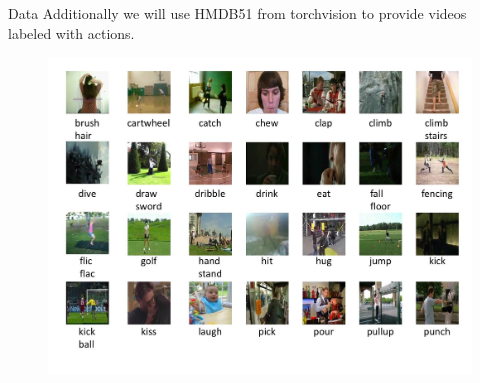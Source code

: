 \documentclass[aspectratio=169]{beamer}
\begin{document}







\begin{frame}{Data}
Additionally we will use HMDB51 from torchvision to provide videos labeled with actions.

\begin{figure}
    \centering
    \includegraphics[width=0.7\linewidth]{images/image.png}
\end{figure}

\end{frame}
\end{document}
